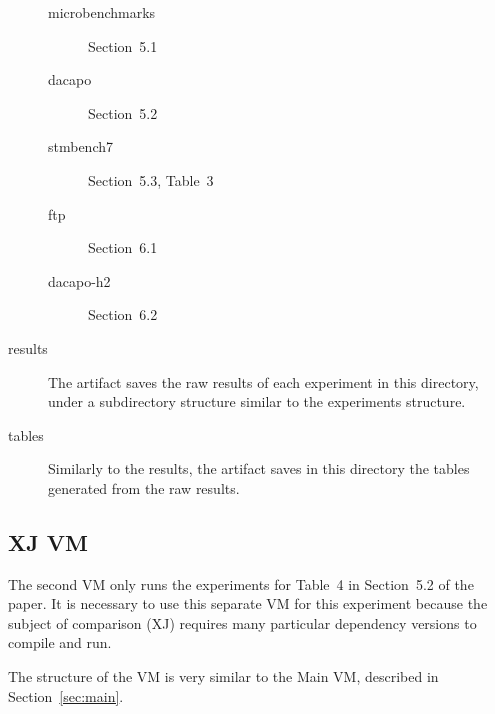 \documentclass[12pt]{article}
\begin{document}
\begin{description}
        \begin{description}

            \item[microbenchmarks] Section~5.1

            \item[dacapo] Section~5.2

            \item[stmbench7] Section~5.3, Table~3

            \item[ftp] Section~6.1

            \item[dacapo-h2] Section~6.2

        \end{description}

    \item[results]  The artifact saves the raw results of each experiment in
        this directory, under a subdirectory structure similar to the
        experiments structure.

    \item[tables]  Similarly to the results, the artifact saves in this
        directory the tables generated from the raw results.

\end{description}

\subsection{XJ VM}
\label{sec:xj}

The second VM only runs the experiments for Table~4 in Section~5.2 of the paper.
It is necessary to use this separate VM for this experiment because the subject of comparison (XJ) requires many particular dependency versions to compile and run.

The structure of the VM is very similar to the Main VM, described in
Section~\ref{sec:main}.
\end{document}
